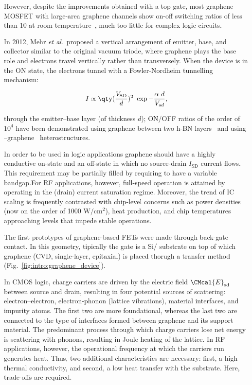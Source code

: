 However, despite the improvements obtained with a top gate, most graphene \gls{MOSFET} with large-area graphene channels show on-off switching ratios of less than 10 at room temperature~\cite{schwierz2010graphene}, much too little for complex logic circuits.

In 2012, Mehr \textit{et al}.\ proposed a vertical arrangement of emitter, base, and collector similar to the original vacuum triode, where graphene plays the base role and electrons travel vertically rather than transversely.
When the device is in the ON state, the electrons tunnel with a Fowler-Nordheim tunnelling mechanism:

\begin{equation}
    I\propto\qty(\frac{V_\textrm{SD}}{d})^2~\exp{-\frac{\alpha~d}{V_{sd}}},
\end{equation}

through the emitter--base layer (of thickness $d$); ON/OFF ratios of the order of $10^4$ have been demonstrated using graphene between two h-BN layers~\cite{britnell2012field} and using --graphene~\cite{georgiou2013vertical} heterostructures.




In order to be used in logic applications graphene should have a highly conductive on-state and an off-state in which no source-drain $I_\textrm{SD}$ current flows. This requirement may be partially filled by requiring to have a variable bandgap.For \gls{RF} applications, however, full-speed operation is attained by operating in the (drain) current saturation regime. Moreover, the trend of \gls{IC} scaling is frequently contrasted with chip-level concerns such as power densities (now on the order of 1000 W/cm$^2$), heat production, and chip temperatures approaching levels that impede stable operations.

The first prototypes of graphene-based \glspl{FET} were made through back-gate contact. In this geometry, tipically the gate is a Si/ substrate on top of which graphene (\gls{CVD}, single-layer, epitaxial) is placed thorugh a transfer method (Fig.~\ref{fig:intro:graphene_device}).

In CMOS logic, charge carriers are driven by the electric field  $\CMcal{E}_\textrm{sd}$ between source and drain, resulting in four potential sources of scattering: electron--electron, electron-phonon (lattice vibrations), material interfaces, and impurity atoms. The first two are more foundational, whereas the last two are connected to the type of interfaces formed between graphene and its support material. The predominant process through which charge carriers lose net energy is scattering with phonons, resulting in Joule heating of the lattice. In \gls{RF} applications, however, the operational frequency at which the carriers run generates heat. Thus, two additional characteristics are necessary: first, a high thermal conductivity, and second, a low heat transfer with the substrate. Here, trade-offs are required.

